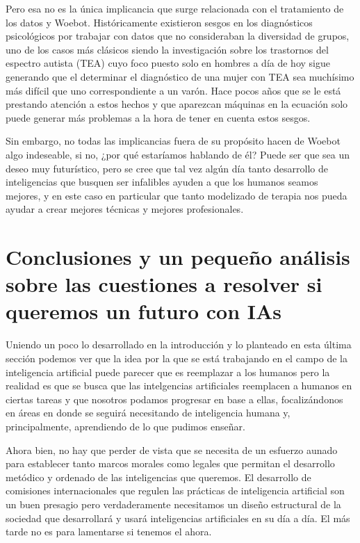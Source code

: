 \documentclass[11pt]{article}
\begin{document}
Pero esa no es la única implicancia que surge relacionada
con el tratamiento de los datos y Woebot. Históricamente 
existieron sesgos en los diagnósticos psicológicos por 
trabajar con datos que no consideraban la diversidad de
grupos, uno de los casos más clásicos siendo la 
investigación sobre los trastornos del espectro autista
(TEA)
cuyo foco puesto solo en hombres a día de hoy sigue 
generando que el determinar el diagnóstico de una 
mujer con TEA sea muchísimo más difícil que uno
correspondiente a un varón. Hace pocos años que 
se le está prestando atención a estos hechos y 
que aparezcan máquinas
en la ecuación solo puede generar más problemas a la 
hora de tener en cuenta estos sesgos. 

Sin embargo, no todas las implicancias fuera de su propósito
hacen de Woebot algo indeseable, si no, ¿por qué estaríamos 
hablando de él? Puede ser que sea un deseo muy futurístico,
pero se cree que tal vez algún día tanto desarrollo de 
inteligencias que busquen ser infalibles ayuden a que los
humanos seamos mejores, y en este caso en particular que 
tanto modelizado de terapia nos pueda ayudar a crear 
mejores técnicas y mejores profesionales.


\section{Conclusiones y un pequeño análisis sobre las cuestiones a resolver si queremos un futuro con IAs}
Uniendo un poco lo desarrollado en la introducción y
lo planteado en esta última sección podemos ver que la 
idea por la que se está trabajando en el campo de la 
inteligencia artificial puede parecer que es 
reemplazar a los humanos pero la realidad es que se busca
que las intelgencias artificiales reemplacen a humanos en 
ciertas tareas y que nosotros podamos progresar en base a 
ellas, focalizándonos en áreas en donde se seguirá 
necesitando de inteligencia humana y, principalmente, 
aprendiendo de lo que pudimos enseñar.

Ahora bien, no hay que perder de vista que se necesita 
de un esfuerzo aunado para establecer
tanto marcos morales como legales que permitan el desarrollo 
metódico y ordenado
de las inteligencias que queremos. El desarrollo de 
comisiones internacionales que regulen las 
prácticas de inteligencia artificial son un buen presagio 
pero verdaderamente necesitamos un diseño estructural 
de la sociedad que desarrollará y usará inteligencias 
artificiales en su día a día. El más tarde no es
para lamentarse si tenemos el ahora.
\end{document}
